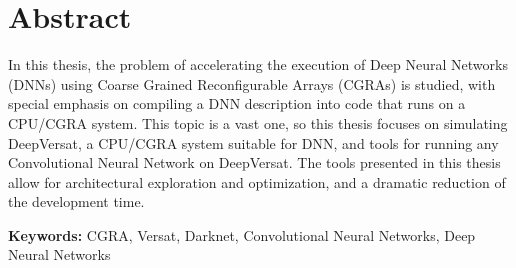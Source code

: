 
\section*{Abstract}


In this thesis, the problem of accelerating the execution of Deep Neural
Networks (DNNs) using Coarse Grained Reconfigurable Arrays (CGRAs) is studied,
with special emphasis on compiling a DNN description into code that runs on a
CPU/CGRA system. This topic is a vast one, so this thesis focuses on simulating
DeepVersat, a CPU/CGRA system suitable for DNN, and tools for running any
Convolutional Neural Network on DeepVersat. The tools presented in this thesis
allow for architectural exploration and optimization, and a dramatic reduction
of the development time.


\vfill

\textbf{\Large Keywords:} CGRA, Versat, Darknet, Convolutional Neural Networks, Deep Neural Networks


